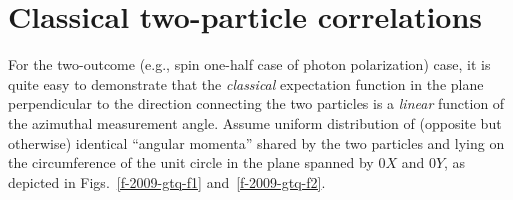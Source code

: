 \documentclass[pra,amsfonts,showpacs,showkeys,preprint]{revtex4}
\begin{document}

\section{Classical two-particle correlations}


For the two-outcome (e.g., spin one-half case of photon polarization) case,
it is quite easy to demonstrate that the {\em classical} expectation function
in the plane perpendicular to the direction connecting the two particles is a {\em linear} function of the azimuthal measurement angle.
Assume uniform  distribution of (opposite but otherwise) identical ``angular momenta'' shared by the two particles and lying on the circumference
of the unit circle in the plane spanned by $0X$ and $0Y$, as depicted in Figs.~\ref{f-2009-gtq-f1} and~\ref{f-2009-gtq-f2}.
%
\end{document}
